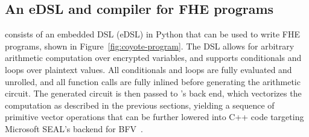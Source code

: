     

    

\subsection{An eDSL and compiler for FHE programs}\label{sec:surface-language}
\system consists of an embedded DSL (eDSL) in Python that can be used to write FHE programs, shown in Figure~\ref{fig:coyote-program}.
The DSL allows for arbitrary arithmetic computation over encrypted variables, and supports conditionals and loops over plaintext values. 
All conditionals and loops are fully evaluated and unrolled, and all function calls are fully inlined before generating the arithmetic circuit.
The generated circuit is then passed to \system's back end, which vectorizes the computation as described in the previous sections, yielding a sequence of primitive vector operations that can be further lowered into C++ code targeting Microsoft SEAL's backend for BFV~\cite{seal}.

